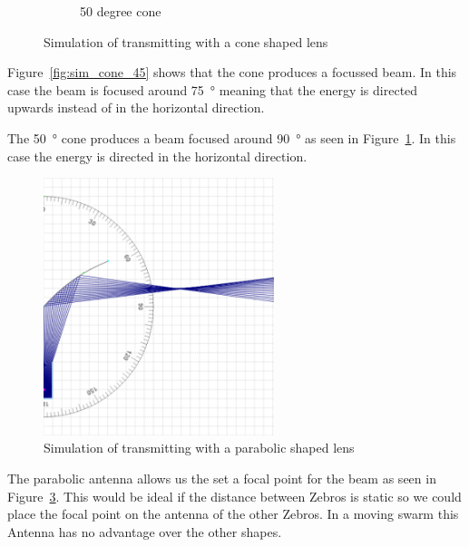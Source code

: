 \begin{figure}[H]
\begin{subfigure}{.5\textwidth}
  \caption{50 degree cone}
  \label{fig:sim_cone_50}
\end{subfigure}
\caption{Simulation of transmitting with a cone shaped lens}
\label{fig:cone}
\end{figure}


Figure~\ref{fig:sim_cone_45} shows that the cone produces a focussed beam.
In this case the beam is focused around \SI{75}{\degree} meaning that the energy is directed upwards instead of in the horizontal direction.


The \SI{50}{\degree} cone produces a beam focused around \SI{90}{\degree} as seen in Figure~\ref{fig:sim_cone_50}.
In this case the energy is directed in the horizontal direction.

\begin{figure}[H]
\centering
\includegraphics[width=0.6\textwidth]{Figures/sim_par.PNG}
\caption{Simulation of transmitting with a parabolic shaped lens}
\label{fig:sim_para}
\end{figure}

The parabolic antenna allows us the set a focal point for the beam as seen in Figure~\ref{fig:sim_para}.
This would be ideal if the distance between Zebros is static so we could place the focal point on the antenna of the other Zebros.
In a moving swarm this Antenna has no advantage over the other shapes.

